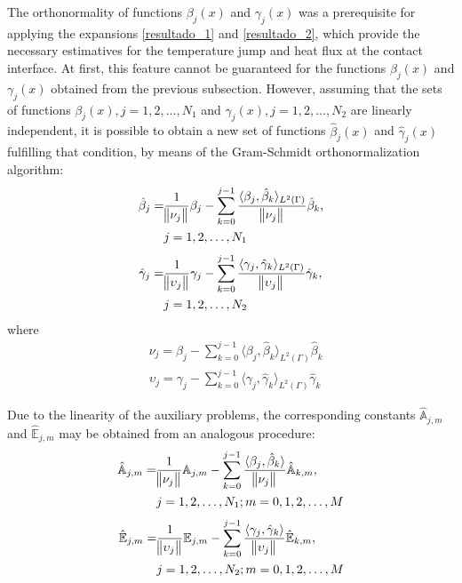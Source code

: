 \documentclass[conference,compsoc,fleqn]{IEEEtran}
\begin{document}
The orthonormality of functions $\beta_j(x)$ and $\gamma_j(x)$ was a prerequisite for applying the expansions \eqref{resultado_1} and \eqref{resultado_2}, which provide the necessary estimatives for the temperature jump and heat flux at the contact interface. At first, this feature cannot be guaranteed for the functions $\beta_j(x)$ and $\gamma_j(x)$ obtained from the previous subsection. However, assuming that the sets of functions $\beta_j(x), j=1,2,\dots, N_1$ and $\gamma_j(x), j=1,2,\dots, N_2$ are linearly independent, it is possible to obtain a new set of functions $\hat{\beta}_j(x)$ and $\hat{\gamma}_j(x)$ fulfilling that condition, by means of the Gram-Schmidt orthonormalization algorithm:
\begin{align}
\hat{\beta}_j = & \frac{1}{\norm{\nu_j}}\beta_j - \sum_{k=0}^{j-1} \frac{\langle \beta_j, \hat{\beta}_k \rangle_{L^2(\Gamma)}}{\norm{\nu_j}} \hat{\beta}_k \label{termo_beta} , \\
& j=1,2,\dots, N_1 
\end{align}
\begin{align}
\hat{\gamma}_j = & \frac{1}{\norm{\upsilon_j}}\gamma_j - \sum_{k=0}^{j-1} \frac{\langle \gamma_j, \hat{\gamma}_k \rangle_{L^2(\Gamma)}}{\norm{\upsilon_j}} \hat{\gamma}_k \label{termo_gamma},  \\
& j=1,2,\dots, N_2 \nonumber 
\end{align}
where
\begin{align}
& \nu_j = \beta_j - \sum_{k = 0}^{j - 1} \langle \beta_j, \hat{\beta}_k\rangle_{L^2(\Gamma)}\hat{\beta}_k \\
& \upsilon_j = \gamma_j - \sum_{k = 0}^{j - 1} \langle \gamma_j, \hat{\gamma}_k\rangle_{L^2(\Gamma)}\hat{\gamma}_k
\end{align}

Due to the linearity of the auxiliary problems, the corresponding constants $\hat{\mathbb{A}}_{j,m}$ and $\hat{\mathbb{E}}_{j,m}$ may be obtained from an analogous procedure:
\begin{align}
\hat{\mathbb{A}}_{j,m} = & \frac{1}{\norm{\nu_j}} \mathbb{A}_{j,m} - \sum_{k=0}^{j-1} \frac{\langle \beta_j, \hat{\beta}_k \rangle}{\norm{\nu_j}} \hat{\mathbb{A}}_{k,m}
\label{expressao_relaciona_psi} ,\\
& j=1,2,\dots, N_1; m=0,1,2,\ldots,M
\end{align}
\begin{align}
\hat{\mathbb{E}}_{j,m} = & \frac{1}{\norm{\upsilon_j}} \mathbb{E}_{j,m} - \sum_{k=0}^{j-1} \frac{\langle \gamma_j, \hat{\gamma}_k \rangle}{\norm{\upsilon_j}} \hat{\mathbb{E}}_{k,m}
\label{expressao_relaciona_zeta} , \\
& j=1,2,\dots, N_2 ; m=0,1,2,\ldots,M  \nonumber 
\end{align}
\end{document}
